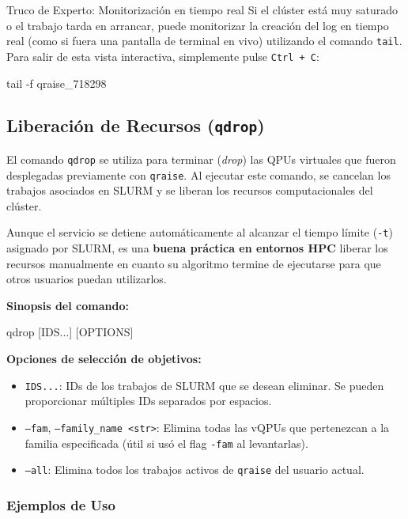 \documentclass[a4paper,11pt]{article}
\begin{document}
\begin{infobox}{Truco de Experto: Monitorización en tiempo real}
Si el clúster está muy saturado o el trabajo tarda en arrancar, puede monitorizar la creación del log en tiempo real (como si fuera una pantalla de terminal en vivo) utilizando el comando \texttt{tail}. Para salir de esta vista interactiva, simplemente pulse \texttt{Ctrl + C}:
\end{infobox}

\begin{terminal}
tail -f qraise_718298
\end{terminal}

\subsection{Liberación de Recursos (\texttt{qdrop})}

El comando \texttt{qdrop} se utiliza para terminar (\textit{drop}) las QPUs virtuales que fueron desplegadas previamente con \texttt{qraise}. Al ejecutar este comando, se cancelan los trabajos asociados en SLURM y se liberan los recursos computacionales del clúster.

Aunque el servicio se detiene automáticamente al alcanzar el tiempo límite (\texttt{-t}) asignado por SLURM, es una \textbf{buena práctica en entornos HPC} liberar los recursos manualmente en cuanto su algoritmo termine de ejecutarse para que otros usuarios puedan utilizarlos.

\textbf{Sinopsis del comando:}
\begin{terminal}
qdrop [IDS...] [OPTIONS]
\end{terminal}

\vspace{0.3cm}
\textbf{Opciones de selección de objetivos:}
\begin{itemize}
    \item \texttt{IDS...}: IDs de los trabajos de SLURM que se desean eliminar. Se pueden proporcionar múltiples IDs separados por espacios.
    \item \texttt{--fam}, \texttt{--family\_name <str>}: Elimina todas las vQPUs que pertenezcan a la familia especificada (útil si usó el flag \texttt{-fam} al levantarlas).
    \item \texttt{--all}: Elimina todos los trabajos activos de \texttt{qraise} del usuario actual.
\end{itemize}

\subsubsection{Ejemplos de Uso}
\end{document}
